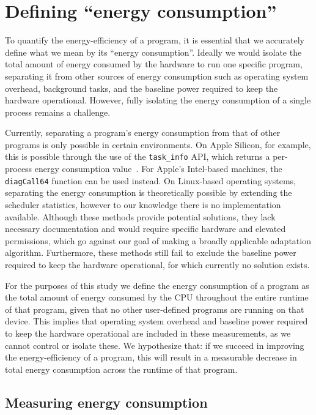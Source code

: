 
\section{Defining ``energy consumption''}\label{sec:defining-energy}

To quantify the energy-efficiency of a program, it is essential that we accurately define what we
mean by its ``energy consumption''. Ideally we would isolate the total amount of energy consumed by
the hardware to run one specific program, separating it from other sources of energy consumption
such as operating system overhead, background tasks, and the baseline power required to keep the
hardware operational. However, fully isolating the energy consumption of a single process remains a
challenge.

Currently, separating a program's energy consumption from that of other programs is only possible in
certain environments. On Apple Silicon, for example, this is possible through the use of the
\verb|task_info| API, which returns a per-process energy consumption value~\cite{firefox-profiling}.
For Apple's Intel-based machines, the \verb|diagCall64| function can be used instead. On Linux-based
operating systems, separating the energy consumption is theoretically possible by extending the
scheduler statistics, however to our knowledge there is no implementation available. Although these
methods provide potential solutions, they lack necessary documentation and would require specific
hardware and elevated permissions, which go against our goal of making a broadly applicable
adaptation algorithm. Furthermore, these methods still fail to exclude the baseline power required
to keep the hardware operational, for which currently no solution exists.

For the purposes of this study we define the energy consumption of a program as the total amount of
energy consumed by the CPU throughout the entire runtime of that program, given that no other
user-defined programs are running on that device. This implies that operating system overhead and
baseline power required to keep the hardware operational are included in these measurements, as we
cannot control or isolate these. We hypothesize that: if we succeed in improving the
energy-efficiency of a program, this will result in a measurable decrease in total energy
consumption across the runtime of that program.

\subsection{Measuring energy consumption}

